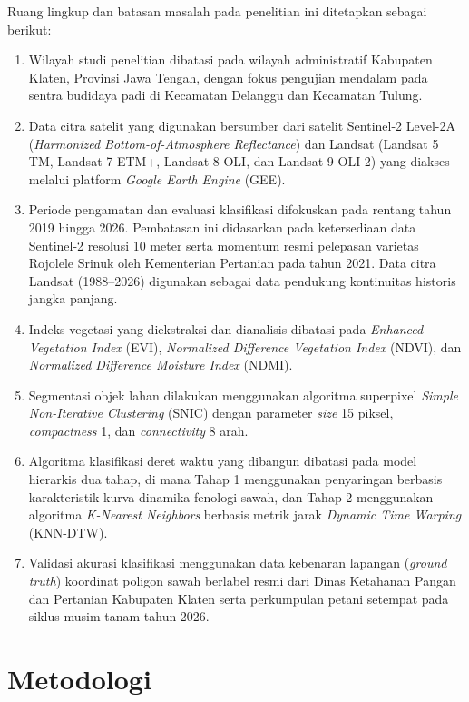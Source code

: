 Ruang lingkup dan batasan masalah pada penelitian ini ditetapkan sebagai berikut:
\begin{enumerate}
    \item Wilayah studi penelitian dibatasi pada wilayah administratif Kabupaten Klaten, Provinsi Jawa Tengah, dengan fokus pengujian mendalam pada sentra budidaya padi di Kecamatan Delanggu dan Kecamatan Tulung.
    \item Data citra satelit yang digunakan bersumber dari satelit Sentinel-2 Level-2A (\textit{Harmonized Bottom-of-Atmosphere Reflectance}) dan Landsat (Landsat 5 TM, Landsat 7 ETM+, Landsat 8 OLI, dan Landsat 9 OLI-2) yang diakses melalui platform \textit{Google Earth Engine} (GEE).
    \item Periode pengamatan dan evaluasi klasifikasi difokuskan pada rentang tahun 2019 hingga 2026. Pembatasan ini didasarkan pada ketersediaan data Sentinel-2 resolusi 10 meter serta momentum resmi pelepasan varietas Rojolele Srinuk oleh Kementerian Pertanian pada tahun 2021. Data citra Landsat (1988--2026) digunakan sebagai data pendukung kontinuitas historis jangka panjang.
    \item Indeks vegetasi yang diekstraksi dan dianalisis dibatasi pada \textit{Enhanced Vegetation Index} (EVI), \textit{Normalized Difference Vegetation Index} (NDVI), dan \textit{Normalized Difference Moisture Index} (NDMI).
    \item Segmentasi objek lahan dilakukan menggunakan algoritma superpixel \textit{Simple Non-Iterative Clustering} (SNIC) dengan parameter \textit{size} 15 piksel, \textit{compactness} 1, dan \textit{connectivity} 8 arah.
    \item Algoritma klasifikasi deret waktu yang dibangun dibatasi pada model hierarkis dua tahap, di mana Tahap 1 menggunakan penyaringan berbasis karakteristik kurva dinamika fenologi sawah, dan Tahap 2 menggunakan algoritma \textit{K-Nearest Neighbors} berbasis metrik jarak \textit{Dynamic Time Warping} (KNN-DTW).
    \item Validasi akurasi klasifikasi menggunakan data kebenaran lapangan (\textit{ground truth}) koordinat poligon sawah berlabel resmi dari Dinas Ketahanan Pangan dan Pertanian Kabupaten Klaten serta perkumpulan petani setempat pada siklus musim tanam tahun 2026.
\end{enumerate}

\section{Metodologi}
\label{sec:metodologi}

